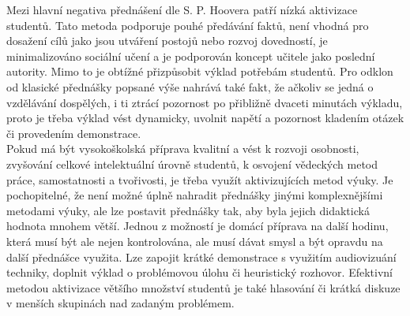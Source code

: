 Mezi hlavní negativa přednášení dle S. P. Hoovera  patří nízká aktivizace studentů. Tato metoda podporuje pouhé předávání faktů, není vhodná pro dosažení cílů jako jsou utváření postojů nebo rozvoj dovedností, je minimalizováno sociální učení a je podporován koncept učitele jako poslední autority. Mimo to je obtížné přizpůsobit výklad potřebám studentů. \cite{slavik2012} Pro odklon od klasické přednášky popsané výše nahrává také fakt, že ačkoliv se jedná o vzdělávání dospělých, i ti ztrácí pozornost po přibližně dvaceti minutách výkladu, proto je třeba výklad vést dynamicky, uvolnit napětí a pozornost kladením otázek či provedením demonstrace. \cite{rohlikova2012}\\

Pokud má být vysokoškolská příprava kvalitní a vést k rozvoji osobnosti, zvyšování celkové intelektuální úrovně studentů, k osvojení vědeckých metod práce, samostatnosti a tvořivosti, je třeba využít aktivizujících metod výuky. \cite{novotna1985} Je pochopitelné, že není možné úplně nahradit přednášky jinými komplexnějšími metodami výuky, ale lze postavit přednášky tak, aby byla jejich didaktická hodnota mnohem větší. Jednou z možností je domácí příprava na další hodinu, která musí být ale nejen kontrolována, ale musí dávat smysl a být opravdu na další přednášce využita. Lze zapojit krátké demonstrace s využitím audiovizuání techniky, doplnit výklad o problémovou úlohu či heuristický rozhovor. Efektivní metodou aktivizace většího množství studentů je také hlasování či krátká diskuze v menších skupinách nad zadaným problémem.\cite{rohlikova2012}
